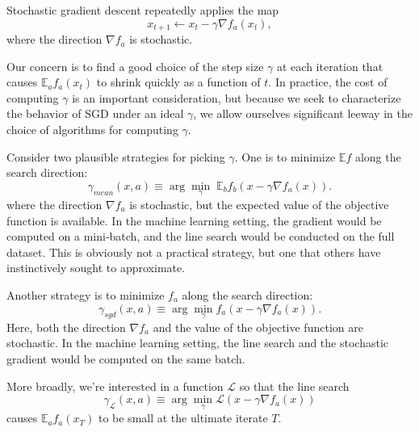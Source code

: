 \documentclass{article}
\newcommand{\E}{\mathbb{E}}
\renewcommand{\L}{\mathcal{L}}
\begin{document}
Stochastic gradient descent repeatedly applies the map
\begin{equation}
x_{t+1} \leftarrow x_t - \gamma \nabla f_a(x_t), \label{eq:sgd}
\end{equation}
where the direction $\nabla f_a$ is stochastic.

Our concern is to find a good choice of the step size $\gamma$ at each iteration that causes $\E_a f_a(x_t)$ to shrink quickly as a function of $t$. In practice, the cost of computing $\gamma$ is an important consideration, but because we seek to characterize the behavior of SGD under an ideal $\gamma$, we allow ourselves significant leeway in the choice of algorithms for computing $\gamma$.

Consider two plausible strategies for picking $\gamma$. One is to minimize $\E f$ along the search direction:
$$\gamma_{mean}(x,a) \equiv \arg\min_\gamma\; \E_b f_b(x-\gamma \nabla f_a(x)).$$
where the direction $\nabla f_a$ is stochastic, but the expected value of the objective function is available. In the machine learning setting, the gradient would be computed on a mini-batch, and the line search would be conducted on the full dataset. This is obviously not a practical strategy, but one that others have instinctively sought to approximate.

Another strategy is to minimize $f_a$ along the search direction:
$$\gamma_{sgd}(x,a) \equiv \arg\min_\gamma f_a(x-\gamma \nabla f_a(x)).$$
Here, both the direction $\nabla f_a$ and the value of the objective function are stochastic. In the machine learning setting, the line search and the stochastic gradient would be computed on the same batch.

More broadly, we're interested in a function $\L$ so that the line search
$$\gamma_\L(x,a) \equiv \arg\min_\gamma \L(x-\gamma \nabla f_a(x))$$
causes $\E_a f_a(x_T)$ to be small at the ultimate iterate $T$.
\end{document}
